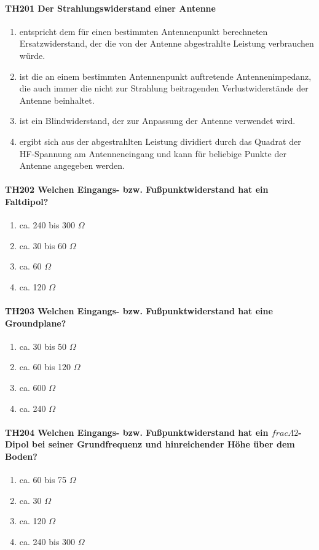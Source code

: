 \documentclass[8pt]{article}
\begin{document}
\paragraph*{TH201 Der Strahlungswiderstand einer Antenne}
\begin{enumerate}[nolistsep,label=\Alph*]
\item entspricht dem für einen bestimmten Antennenpunkt berechneten Ersatzwiderstand, der die von der Antenne abgestrahlte Leistung verbrauchen würde.
\item ist die an einem bestimmten Antennenpunkt auftretende Antennenimpedanz, die auch immer die nicht zur Strahlung beitragenden Verlustwiderstände der Antenne beinhaltet.
\item ist ein Blindwiderstand, der zur Anpassung der Antenne verwendet wird.
\item ergibt sich aus der abgestrahlten Leistung dividiert durch das Quadrat der HF-Spannung am Antenneneingang und kann für beliebige Punkte der Antenne angegeben werden.
\end{enumerate}

\paragraph*{TH202 Welchen Eingangs- bzw. Fußpunktwiderstand hat ein Faltdipol?}
\begin{enumerate}[nolistsep,label=\Alph*]
\item ca. 240 bis 300 $\Omega$
\item ca. 30 bis 60 $\Omega$
\item ca. 60 $\Omega$
\item ca. 120 $\Omega$
\end{enumerate}

\paragraph*{TH203 Welchen Eingangs- bzw. Fußpunktwiderstand hat eine Groundplane?}
\begin{enumerate}[nolistsep,label=\Alph*]
\item ca. 30 bis 50 $\Omega$
\item ca. 60 bis 120 $\Omega$
\item ca. 600 $\Omega$
\item ca. 240 $\Omega$
\end{enumerate}

\paragraph*{TH204 Welchen Eingangs- bzw. Fußpunktwiderstand hat ein $frac{\Lambda}{2}$-Dipol bei seiner Grundfrequenz und hinreichender Höhe über dem Boden?}
\begin{enumerate}[nolistsep,label=\Alph*]
\item ca. 60 bis 75 $\Omega$
\item ca. 30 $\Omega$
\item ca. 120 $\Omega$
\item ca. 240 bis 300 $\Omega$
\end{enumerate}
\end{document}
